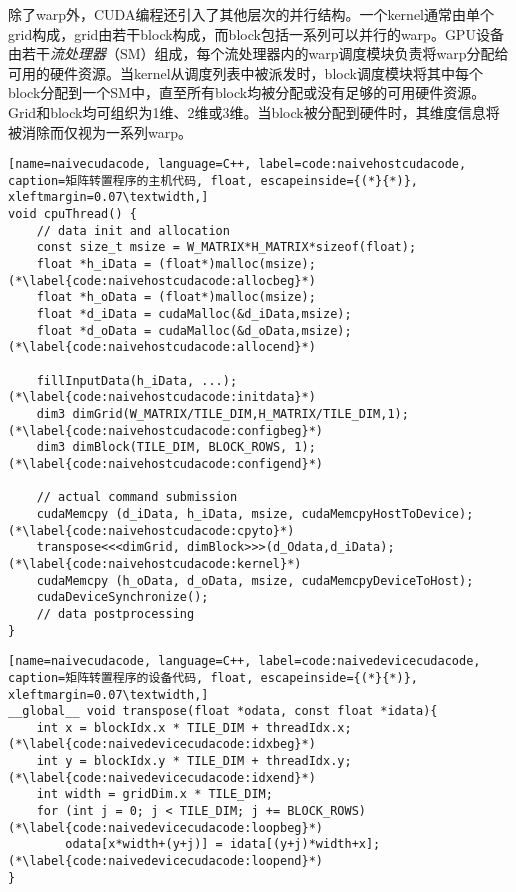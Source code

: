 除了warp外，CUDA编程还引入了其他层次的并行结构。一个kernel通常由单个grid构成，grid由若干block构成，而block包括一系列可以并行的warp。GPU设备由若干\emph{流处理器}（SM）组成，每个流处理器内的warp调度模块负责将warp分配给可用的硬件资源。当kernel从调度列表中被派发时，block调度模块将其中每个block分配到一个SM中，直至所有block均被分配或没有足够的可用硬件资源。Grid和block均可组织为1维、2维或3维。当block被分配到硬件时，其维度信息将被消除而仅视为一系列warp。

\begin{lstlisting}[name=naivecudacode, language=C++, label=code:naivehostcudacode, caption=矩阵转置程序的主机代码, float, escapeinside={(*}{*)}, xleftmargin=0.07\textwidth,]
void cpuThread() {
    // data init and allocation
    const size_t msize = W_MATRIX*H_MATRIX*sizeof(float);
    float *h_iData = (float*)malloc(msize); (*\label{code:naivehostcudacode:allocbeg}*)
    float *h_oData = (float*)malloc(msize);
    float *d_iData = cudaMalloc(&d_iData,msize);
    float *d_oData = cudaMalloc(&d_oData,msize);(*\label{code:naivehostcudacode:allocend}*)

    fillInputData(h_iData, ...); (*\label{code:naivehostcudacode:initdata}*)
    dim3 dimGrid(W_MATRIX/TILE_DIM,H_MATRIX/TILE_DIM,1);(*\label{code:naivehostcudacode:configbeg}*)
    dim3 dimBlock(TILE_DIM, BLOCK_ROWS, 1); (*\label{code:naivehostcudacode:configend}*)

    // actual command submission
    cudaMemcpy (d_iData, h_iData, msize, cudaMemcpyHostToDevice); (*\label{code:naivehostcudacode:cpyto}*)
    transpose<<<dimGrid, dimBlock>>>(d_Odata,d_iData); (*\label{code:naivehostcudacode:kernel}*)
    cudaMemcpy (h_oData, d_oData, msize, cudaMemcpyDeviceToHost);
    cudaDeviceSynchronize();
    // data postprocessing
}
\end{lstlisting}

\begin{lstlisting}[name=naivecudacode, language=C++, label=code:naivedevicecudacode, caption=矩阵转置程序的设备代码, float, escapeinside={(*}{*)}, xleftmargin=0.07\textwidth,]
__global__ void transpose(float *odata, const float *idata){
    int x = blockIdx.x * TILE_DIM + threadIdx.x; (*\label{code:naivedevicecudacode:idxbeg}*)
    int y = blockIdx.y * TILE_DIM + threadIdx.y; (*\label{code:naivedevicecudacode:idxend}*)
    int width = gridDim.x * TILE_DIM;
    for (int j = 0; j < TILE_DIM; j += BLOCK_ROWS) (*\label{code:naivedevicecudacode:loopbeg}*)
        odata[x*width+(y+j)] = idata[(y+j)*width+x]; (*\label{code:naivedevicecudacode:loopend}*)
}
\end{lstlisting}

